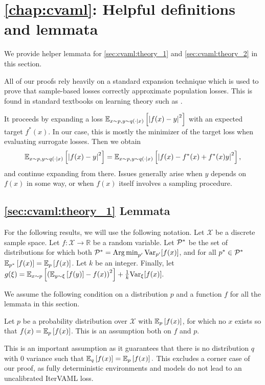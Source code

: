 \section{\autoref{chap:cvaml}: Helpful definitions and lemmata}
\label{app:formal:cvaml}

We provide helper lemmata for \autoref{sec:cvaml:theory_1} and \autoref{sec:cvaml:theory_2} in this section.

All of our proofs rely heavily on a standard expansion technique which is used to prove that sample-based losses correctly approximate population losses.
This is found in standard textbooks on learning theory such as \textcite{gyrfi2002adt}. 

It proceeds by expanding a loss $\EEX{x\sim p, y\sim q(\cdot|x)}{\left|f(x) - y\right|^2}$ with an expected target $f^*(x)$.
In our case, this is mostly the minimizer of the target loss when evaluating surrogate losses.
Then we obtain $$\EEX{x\sim p, y\sim q(\cdot|x)}{\left|f(x) - y\right|^2} = \EEX{x\sim p, y\sim q(\cdot|x)}{\left|f(x) - f^*(x) + f^*(x) y\right|^2},$$
and continue expanding from there.
Issues generally arise when $y$ depends on $f(x)$ in some way, or when $f(x)$ itself involves a sampling procedure.

\subsection{\autoref{sec:cvaml:theory_1} Lemmata}

For the following results, we will use the following notation.
Let $\mathcal{X}$ be a discrete sample space. 
Let $f: \mathcal{X} \rightarrow \mathbb{R}$ be a random variable.
Let $\P^*$ be the set of distributions for which both $\P^* = \Argmin_{p'} \mathrm{Var}_{p'}[f(x)]$, and for all $p^* \in \P^*$ $\EEX{p^*}{f(x)} = \EEX{p}{f(x)}$.
Let $k$ be an integer.
Finally, let $g(\xi) = \EEX{x \sim p}{\left(\EEX{y \sim \xi}{f(y)} - f(x)\right)^2} + \frac{1}{k}\mathrm{Var}_\xi[f(x)].$

We assume the following condition on a distribution $p$ and a function $f$ for all the lemmata in this section.
\begin{assumption}
Let $p$ be a probability distribution over $\mathcal{X}$ with $\EEX{p}{f(x)}$, for which no $x$ exists so that $f(x) = \EEX{p}{f(x)}$.
This is an assumption both on $f$ and $p$.
\end{assumption}
This is an important assumption as it guarantees that there is no distribution $q$ with $0$ variance such that $\EEX{q}{f(x)} = \EEX{p}{f(x)}.$
This excludes a corner case of our proof, as fully deterministic environments and models do not lead to an uncalibrated IterVAML loss.

